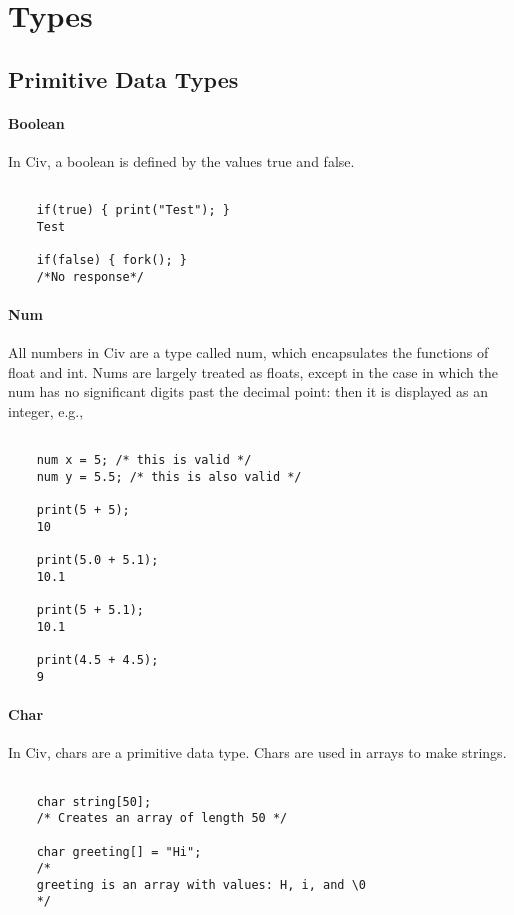 \documentclass[a4paper]{article}
\begin{document}
\section{Types}

\subsection{Primitive Data Types}
\paragraph{Boolean}
In Civ, a boolean is defined by the values {\selectfont true} and {\selectfont false}. 

{\selectfont
\begin{lstlisting} 
    
	if(true) { print("Test"); }
	Test
        
	if(false) { fork(); }
	/*No response*/

\end{lstlisting}
}

\paragraph{Num}
All numbers in Civ are a type called num, which encapsulates the functions of float and int. Nums are largely treated as floats, except in the case in which the num has no significant digits past the decimal point: then it is displayed as an integer, e.g.,

{\selectfont
\begin{lstlisting} 

	num x = 5; /* this is valid */
    num y = 5.5; /* this is also valid */
    
    print(5 + 5);
	10
    
	print(5.0 + 5.1);
	10.1
    
	print(5 + 5.1);
	10.1
    
	print(4.5 + 4.5);
	9

\end{lstlisting}
}

\paragraph{Char}
In Civ, chars are a primitive data type. Chars are used in arrays to make strings. 

{\selectfont
\begin{lstlisting}

	char string[50];
	/* Creates an array of length 50 */
    
	char greeting[] = "Hi";
	/* 
	greeting is an array with values: H, i, and \0
	*/
    
    
\end{lstlisting}
}
\end{document}
